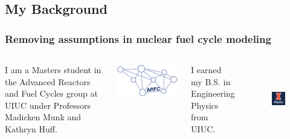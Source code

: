 \documentclass[9pt]{beamer}
\begin{document}
\subsection{My Background}
  \begin{frame}
    \frametitle{Removing assumptions in nuclear fuel cycle modeling}
    \begin{columns}
      \column[t]{5cm}
      I am a Masters student in the Advanced Reactors and Fuel Cycles group at
      UIUC under Professors Madicken Munk and Kathryn Huff.
      \begin{center}
              \includegraphics[height=0.2\textheight]{./images/arfc-logo}
      \end{center}

      \column[t]{5cm}
      I earned my B.S. in Engineering Physics from UIUC.
      \begin{figure}[htbp!]
        \begin{center}
          \includegraphics[height=3cm]{./images/ill_phys.png}
        \end{center}
        \label{fig:uiuc_phys}
      \end{figure}
    \end{columns}
  \end{frame}
\end{document}
